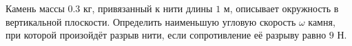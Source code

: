 Камень массы $0.3$ кг, привязанный к нити длины $1$ м,
описывает окружность в вертикальной плоскости.
Определить наименьшую угловую скорость $\omega$ камня,
при которой произойдёт разрыв нити,
если сопротивление её разрыву равно $9$ Н.
